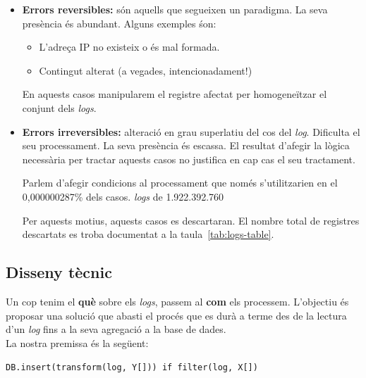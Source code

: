 \begin{itemize}
    \item \textbf{Errors reversibles:} són aquells que segueixen un paradigma.
    La seva presència és abundant.
    Alguns exemples śon:
    \begin{itemize}
        \item L'adreça \gls{IP} no existeix o és mal formada.
        \item Contingut alterat (a vegades, intencionadament!)
    \end{itemize}
    En aquests casos manipularem el registre afectat per homogeneïtzar el conjunt dels \textit{logs}.
    \item \textbf{Errors irreversibles:} alteració en grau superlatiu del cos del \textit{log}.
    Dificulta el seu processament.
    La seva presència és escassa.
    El resultat d'afegir la lògica necessària per tractar aquests casos no justifica en cap cas el seu tractament.

    \begin{tcolorbox}[colback=green!5!white, colframe=green!50!black, title=No val la pena]\label{tcbox:no-val-la-pena}
    Parlem d'afegir condicions al processament que només s'utilitzarien en el 0,000000287\% dels casos.
     \textit{\gls{log}s} de 1.922.392.760
    \end{tcolorbox}

    Per aquests motius, aquests casos es descartaran.
    El nombre total de registres descartats es troba documentat a la taula~\ref{tab:logs-table}.
\end{itemize}

\clearpage

\subsection{Disseny tècnic}\label{subsec:logs-technical-design}

Un cop tenim el \textbf{què} sobre els \textit{\gls{log}s}, passem al \textbf{com} els processem.
L'objectiu és proposar una solució que abasti el procés que es durà a terme des de la lectura d’un \textit{\gls{log}} fins a la seva agregació a la base de dades. \\

\noindent
La nostra premissa és la següent:
\noindent
\begin{center}
    \texttt{DB.insert(transform(log, Y[])) if filter(log, X[])}
\end{center}

